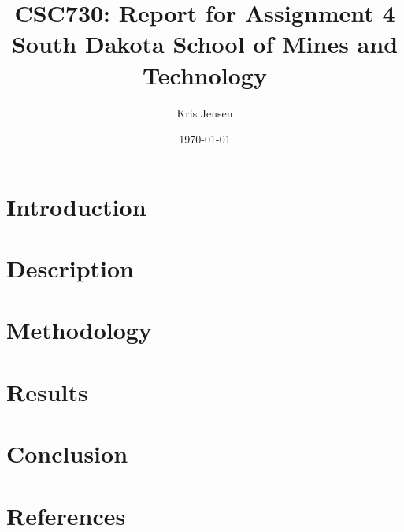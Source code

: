 \documentclass{article}
\begin{document}
\onecolumn %
\setlength{\droptitle}{-6em} 
\title{CSC730: Report for Assignment 4 \\ \large South Dakota School of Mines and Technology}
\author{Kris Jensen}

\date{\today}
\maketitle

\begin{multicols}{2} %
    \let\clearpage\relax
    \section{Introduction}
    
    
    \let\clearpage\relax
    \section{Description}
    

    \let\clearpage\relax
    \section{Methodology}
    

    \let\clearpage\relax
    \section{Results}
    

    \let\clearpage\relax
    \section{Conclusion}
    

    \let\clearpage\relax
    \section{References}
    
\end{multicols}
\end{document}
